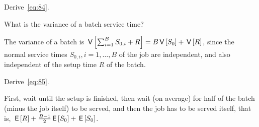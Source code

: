 \begin{extra}
Derive~\cref{eq:84}.
\begin{hint}
  What is the variance of a batch service time?
\end{hint}
\begin{solution}
  The variance of a batch is $\,\mathsf{V}\left[\sum_{i=1}^B S_{0,i} + R\right] = B\,\mathsf{V}\left[S_0\right] + \,\mathsf{V}\left[R\right]$, since the normal service times $S_{0,i}, i=1,\ldots, B$ of the job are independent, and also independent of the setup time $R$ of the batch.
\end{solution}
\end{extra}



\begin{extra}
 Derive~\cref{eq:85}.
\begin{solution}
  First, wait until the setup is finished,  then wait (on average) for half of the batch (minus the job itself) to be served, and then the job has to be served itself, that is,
$\,\mathsf{E}\left[R\right]  + \frac{B-1}{2}\,\mathsf{E}\left[S_0\right] +\,\mathsf{E}\left[S_0\right]$.
\end{solution}
\end{extra}





